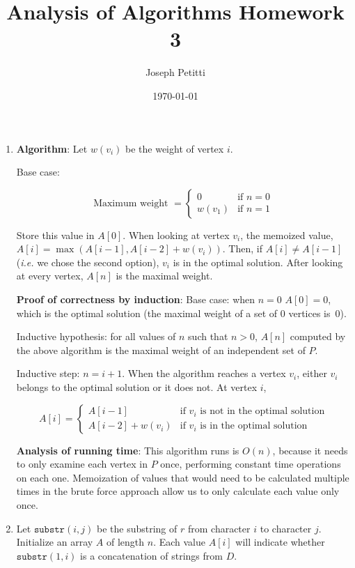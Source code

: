 \documentclass[a4paper, 10pt]{article}
\title{Analysis of Algorithms Homework 3}
\author{Joseph Petitti}
\date{\today}
\begin{document}
\maketitle

\begin{enumerate}
	\item \textbf{Algorithm}: Let $w(v_i)$ be the weight of vertex $i$.

		Base case:

		$$ \textrm{Maximum weight } =
		\begin{cases}
			0 & \textrm{if } n = 0 \\
			w(v_1) & \textrm{if } n = 1
		\end{cases} $$

		Store this value in $A[0]$. When looking at vertex $v_i$, the memoized
		value, $A[i] = \max ( A[i - 1], A[i - 2] + w(v_i))$. Then, if $A[i] \ne
		A[i - 1]$ (\textit{i.e.} we chose the second option), $v_i$ is in the
		optimal solution. After looking at every vertex, $A[n]$ is the maximal
		weight.

		\textbf{Proof of correctness by induction}: Base case: when $n = 0$
		$A[0] = 0$, which is the optimal solution (the maximal weight of a set
		of 0 vertices is~0).

		Inductive hypothesis: for all values of $n$ such that $n > 0$, $A[n]$
		computed by the above algorithm is the maximal weight of an independent
		set of $P$.

		Inductive step: $n = i + 1$. When the algorithm reaches a vertex $v_i$,
		either $v_i$ belongs to the optimal solution or it does not. At vertex
		$i$, 
		
		\[ A[i] =
		\begin{cases}
			A[i - 1] & \textrm{if } v_i \textrm{ is not in the optimal
				solution} \\
			A[i -2] + w(v_i) & \textrm{if } v_i \textrm{ is in the optimal
				solution}
		\end{cases} \]

		\textbf{Analysis of running time}: This algorithm runs is $O(n)$,
		because it needs to only examine each vertex in $P$ once, performing
		constant time operations on each one. Memoization of values that would
		need to be calculated multiple times in the brute force approach allow
		us to only calculate each value only once.

		\newpage

	\item Let $\texttt{substr}(i, j)$ be the substring of $r$ from character $i$
		to character $j$. Initialize an array $A$ of length $n$. Each value
		$A[i]$ will indicate whether $\texttt{substr}(1, i)$ is a concatenation
		of strings from $D$.


\end{enumerate}
\end{document}

